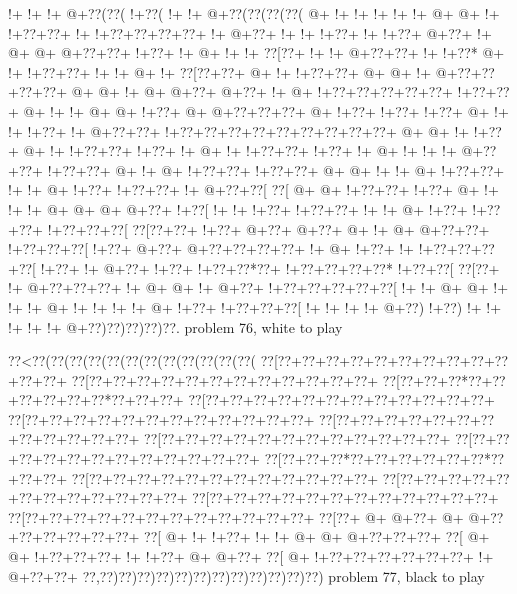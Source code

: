 \vbox{\vbox{\goo
\- !+\- !+\- !+\- @+\0??(\0??(\- !+\0??(\- !+\- !+\- @+\0??(\0??(\0??(\0??(\- @+\- !+\- !+\- !+
\- !+\- !+\- @+\- @+\- !+\- !+\0??+\0??+\- !+\- !+\0??+\0??+\0??+\0??+\- !+\- @+\0??+\- !+\- !+
\- !+\0??+\- !+\- !+\0??+\- @+\0??+\- !+\- @+\- @+\- @+\0??+\0??+\- !+\0??+\- !+\- @+\- !+\- !+
\0??[\0??+\- !+\- !+\- @+\0??+\0??+\- !+\- !+\0??*\- @+\- !+\- !+\0??+\0??+\- !+\- !+\- @+\- !+
\0??[\0??+\0??+\- @+\- !+\- !+\0??+\0??+\- @+\- @+\- !+\- @+\0??+\0??+\0??+\0??+\- @+\- @+\- !+
\- @+\- @+\0??+\- @+\0??+\- !+\- @+\- !+\0??+\0??+\0??+\0??+\0??+\- !+\0??+\0??+\- @+\- !+\- !+
\- @+\- @+\- !+\0??+\- @+\- @+\0??+\0??+\0??+\- @+\- !+\0??+\- !+\0??+\- !+\0??+\- @+\- !+\- !+
\- !+\0??+\- !+\- @+\0??+\0??+\- !+\0??+\0??+\0??+\0??+\0??+\0??+\0??+\0??+\0??+\- @+\- @+\- !+
\- !+\0??+\- @+\- !+\- !+\0??+\0??+\- !+\0??+\- !+\- @+\- !+\- !+\0??+\0??+\- !+\0??+\- !+\- @+
\- !+\- !+\- !+\- @+\0??+\0??+\- !+\0??+\0??+\- @+\- !+\- @+\- !+\0??+\0??+\- !+\0??+\0??+\- @+
\- @+\- !+\- !+\- @+\- !+\0??+\0??+\- !+\- !+\- @+\- !+\0??+\- !+\0??+\0??+\- !+\- @+\0??+\0??[
\0??[\- @+\- @+\- !+\0??+\0??+\- !+\0??+\- @+\- !+\- !+\- !+\- @+\- @+\- @+\- @+\0??+\- !+\0??[
\- !+\- !+\- !+\0??+\- !+\0??+\0??+\- !+\- !+\- @+\- !+\0??+\- !+\0??+\0??+\- !+\0??+\0??+\0??[
\0??[\0??+\0??+\- !+\0??+\- @+\0??+\- @+\0??+\- @+\- !+\- @+\- @+\0??+\0??+\- !+\0??+\0??+\0??[
\- !+\0??+\- @+\0??+\- @+\0??+\0??+\0??+\0??+\- !+\- @+\- !+\0??+\- !+\- !+\0??+\0??+\0??+\0??[
\- !+\0??+\- !+\- @+\0??+\- !+\0??+\- !+\0??+\0??*\0??+\- !+\0??+\0??+\0??+\0??*\- !+\0??+\0??[
\0??[\0??+\- !+\- @+\0??+\0??+\0??+\- !+\- @+\- @+\- !+\- @+\0??+\- !+\0??+\0??+\0??+\0??+\0??[
\- !+\- !+\- @+\- @+\- !+\- !+\- !+\- @+\- !+\- !+\- !+\- !+\- @+\- !+\0??+\- !+\0??+\0??+\0??[
\- !+\- !+\- !+\- !+\- @+\0??)\- !+\0??)\- !+\- !+\- !+\- !+\- !+\- @+\0??)\0??)\0??)\0??)\0??.
}
\hfil problem 76, white to play\hfil\break
}

\vbox{\vbox{\goo
\0??<\0??(\0??(\0??(\0??(\0??(\0??(\0??(\0??(\0??(\0??(\0??(\0??(
\0??[\0??+\0??+\0??+\0??+\0??+\0??+\0??+\0??+\0??+\0??+\0??+\0??+
\0??[\0??+\0??+\0??+\0??+\0??+\0??+\0??+\0??+\0??+\0??+\0??+\0??+
\0??[\0??+\0??+\0??*\0??+\0??+\0??+\0??+\0??+\0??*\0??+\0??+\0??+
\0??[\0??+\0??+\0??+\0??+\0??+\0??+\0??+\0??+\0??+\0??+\0??+\0??+
\0??[\0??+\0??+\0??+\0??+\0??+\0??+\0??+\0??+\0??+\0??+\0??+\0??+
\0??[\0??+\0??+\0??+\0??+\0??+\0??+\0??+\0??+\0??+\0??+\0??+\0??+
\0??[\0??+\0??+\0??+\0??+\0??+\0??+\0??+\0??+\0??+\0??+\0??+\0??+
\0??[\0??+\0??+\0??+\0??+\0??+\0??+\0??+\0??+\0??+\0??+\0??+\0??+
\0??[\0??+\0??+\0??*\0??+\0??+\0??+\0??+\0??+\0??*\0??+\0??+\0??+
\0??[\0??+\0??+\0??+\0??+\0??+\0??+\0??+\0??+\0??+\0??+\0??+\0??+
\0??[\0??+\0??+\0??+\0??+\0??+\0??+\0??+\0??+\0??+\0??+\0??+\0??+
\0??[\0??+\0??+\0??+\0??+\0??+\0??+\0??+\0??+\0??+\0??+\0??+\0??+
\0??[\0??+\0??+\0??+\0??+\0??+\0??+\0??+\0??+\0??+\0??+\0??+\0??+
\0??[\0??+\- @+\- @+\0??+\- @+\- @+\0??+\0??+\0??+\0??+\0??+\0??+
\0??[\- @+\- !+\- !+\0??+\- !+\- !+\- @+\- @+\- @+\0??+\0??+\0??+
\0??[\- @+\- @+\- !+\0??+\0??+\0??+\- !+\- !+\0??+\- @+\- @+\0??+
\0??[\- @+\- !+\0??+\0??+\0??+\0??+\0??+\0??+\- !+\- @+\0??+\0??+
\0??,\0??)\0??)\0??)\0??)\0??)\0??)\0??)\0??)\0??)\0??)\0??)\0??)
}
\hfil problem 77, black to play\hfil\break
}

